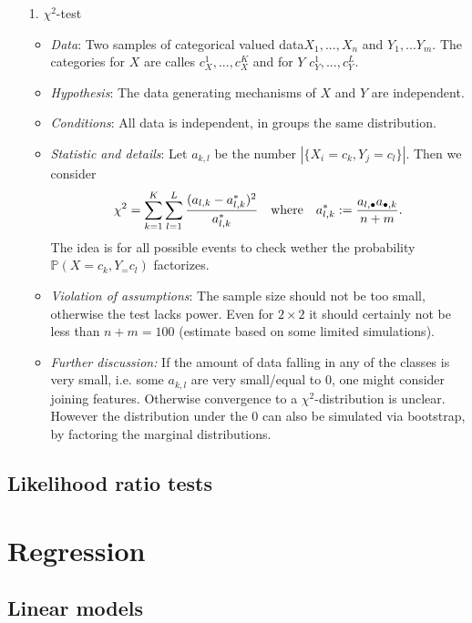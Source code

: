 \documentclass[12pt,a4paper]{amsart}
\theoremstyle{definition}
\theoremstyle{remark}
\numberwithin{equation}{section}
\begin{document}
\begin{itemize}
\item[1.] $\chi^2$-test
\begin{itemize}
\item \textit{Data}: Two samples of categorical valued data$X_1,...,X_n$ and $Y_1,...Y_m$. The categories for $X$ are calles $c_X^1,...,c_X^K$ and for $Y$ $c_Y^1,...,c_Y^L$. 
\item \textit{Hypothesis}: The data generating mechanisms of $X$ and $Y$ are independent.
\item \textit{Conditions}: All data is independent, in groups the same distribution.
\item \textit{Statistic and details}: Let $a_{k,l}$ be the number  $|\{X_i=c_k, Y_j=c_l\}|$. Then we consider 
$$\chi^2=\sum_{k=1}^K \sum_{l=1} ^L \frac{(a_{l,k}-a_{l,k}^*)^2}{a_{l,k}^*} \quad \textnormal{where} \quad a_{l,k}^*:=\frac{a_{l, \bullet}a_{\bullet,k}}{n+m}.$$
The idea is for all possible events to check wether the probability $\mathbb{P}(X=c_k, Y_=c_l)$ factorizes. 
\item \textit{Violation of assumptions}: The sample size should not be too small, otherwise the test lacks power. Even for $2\times 2$ it should certainly not be less than $n+m=100$ (estimate based on some limited simulations).

\item \textit{Further discussion:} If the amount of data falling in any of the classes is very small, i.e. some $a_{k,l}$ are very small/equal to $0$, one might consider joining features. Otherwise convergence to a $\chi^2$-distribution is unclear. However the distribution under the $0$  can also be simulated via bootstrap, by factoring the marginal distributions.  \\


\end{itemize}
\end{itemize}

\subsection{Likelihood ratio tests}

\section{Regression}

\subsection{Linear models}
\end{document}
